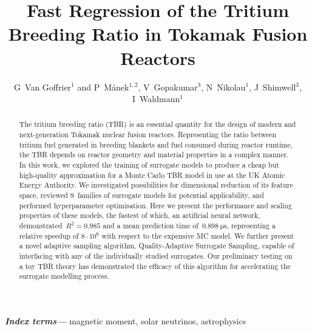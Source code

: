 \documentclass[12pt]{iopart}
\providecommand{\keywords}[1]{\textbf{\textit{Index terms---}} #1}
\begin{document}
\title[Fast Regression of the Tritium Breeding Ratio in Tokamaks]{Fast Regression of the
Tritium Breeding Ratio in Tokamak Fusion Reactors} %

\author{G~Van Goffrier$^1$ and P~Mánek$^{1,2}$, V~Gopakumar$^3$, N~Nikolau$^1$, J~Shimwell$^3$, I~Waldmann$^1$}

\address{$^1$ Department of Physics and Astronomy, University College London, Gower Street, London WC1E~6BT, UK}
\address{$^2$ Institute of Experimental and Applied Physics, Czech Technical University, Husova 240/5, Prague 110~00, Czech Republic}
\address{$^3$ UK Atomic Energy Authority, Culham Science Centre, OX14~3DB Abingdon, UK}


\begin{abstract}
	The tritium breeding ratio (TBR) is an essential quantity for the design of
	modern and next-generation Tokamak nuclear fusion reactors. Representing the
	ratio between tritium fuel generated in breeding blankets and fuel consumed
	during reactor runtime, the TBR depends on reactor geometry and material
	properties in a complex manner. In this work, we explored the
	training of surrogate models to produce a cheap but high-quality approximation
	for a Monte Carlo TBR model in use at the UK Atomic Energy Authority. We
	investigated possibilities for dimensional reduction of its feature space, reviewed
	9~families of surrogate models for potential
	applicability, and performed hyperparameter optimisation. Here we present the
	performance and scaling properties of these
	models, the fastest of which, an artificial neural network,
	demonstrated~$R^2=\num{0.985}$ and a mean
	prediction time of~$\SI{0.898}{\micro\second}$, representing a relative speedup of $8\cdot 10^6$
	with respect to the expensive MC model. We further present a novel adaptive
	sampling algorithm, Quality-Adaptive Surrogate Sampling, capable
	of interfacing with any of the individually studied surrogates. Our preliminary
	testing on a toy TBR theory has demonstrated the efficacy of this algorithm for
	accelerating the surrogate modelling process.
\end{abstract}

\keywords{magnetic moment, solar neutrinos, astrophysics}
\submitto{\jpg}
\maketitle

\end{document}
